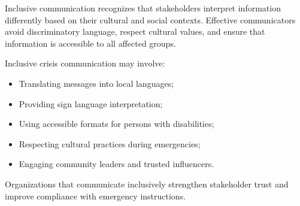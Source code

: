 \documentclass[10pt]{article}
\begin{document}
Inclusive communication recognizes that stakeholders interpret information differently based on their cultural and social contexts. Effective communicators avoid discriminatory language, respect cultural values, and ensure that information is accessible to all affected groups.

Inclusive crisis communication may involve:
\begin{itemize}
    \item Translating messages into local languages;
    \item Providing sign language interpretation;
    \item Using accessible formats for persons with disabilities;
    \item Respecting cultural practices during emergencies;
    \item Engaging community leaders and trusted influencers.
\end{itemize}

Organizations that communicate inclusively strengthen stakeholder trust and improve compliance with emergency instructions.
\end{document}
